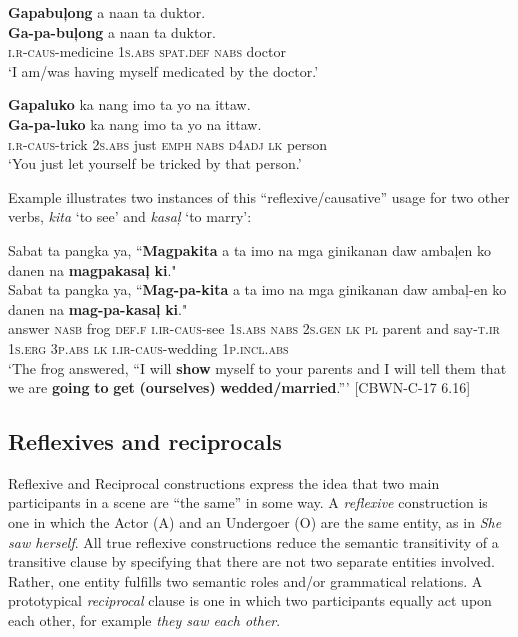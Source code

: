 \ea
\label{bkm:Ref329267373}
\textbf{Gapabuļong}  a  naan  ta  duktor. \\\smallskip
\gll \textbf{Ga-pa-buļong}  a  naan  ta  duktor. \\
\textsc{i.r}-\textsc{caus}-medicine  1\textsc{s.abs}  \textsc{spat.def}  \textsc{nabs}  doctor \\
\glt ‘I am/was having myself medicated by the doctor.’
\z

\ea
\label{bkm:Ref329267376}
\textbf{Gapaluko}  ka  nang  imo  ta  yo  na  ittaw. \\\smallskip
\gll \textbf{Ga-pa-luko}  ka  nang  imo  ta  yo  na  ittaw. \\
\textsc{i.r}-\textsc{caus}-trick  2\textsc{s.abs}  just  \textsc{emph}  \textsc{nabs}  \textsc{d4adj}  \textsc{lk}  person \\
\glt ‘You just let yourself be tricked by that person.'
\z

Example  illustrates two instances of this “reflexive/causative” usage for two other verbs, \textit{kita} ‘to see’ and \textit{kasaļ} ‘to marry’:

\largerpage
\ea
\label{bkm:Ref108689939}
Sabat  ta  pangka  ya,  “\textbf{Magpakita}  a  ta  imo  na  mga ginikanan  daw  ambaļen  ko  danen  na  \textbf{magpakasaļ}  \textbf{ki}." \\\smallskip
\gll Sabat  ta  pangka  ya,  “\textbf{Mag-pa-kita}  a  ta  imo  na  mga ginikanan  daw  ambaļ-en  ko  danen  na  \textbf{mag-pa-kasaļ}  \textbf{ki}." \\
answer  \textsc{nasb}  frog  \textsc{def.f}  \textsc{i.ir}-\textsc{caus}-see  1\textsc{s.abs}  \textsc{nabs}  2\textsc{s.gen}  \textsc{lk}  \textsc{pl}
parent  and  say-\textsc{t.ir}  1\textsc{s.erg}  3\textsc{p.abs}  \textsc{lk}  \textsc{i.ir}-\textsc{caus}-wedding  1\textsc{p.incl.abs} \\
\glt `The frog answered, “I will \textbf{show} myself to your parents and I will tell them that we are \textbf{going} \textbf{to} \textbf{get} \textbf{(ourselves)} \textbf{wedded/married}.”' [CBWN-C-17 6.16]
\z
\subsection{Reflexives and reciprocals}
\label{sec:reflexivesandreciprocals}

Reflexive and Reciprocal constructions 
express the idea that two main participants in a scene are “the same” in some way. A \textit{reflexive} construction is one in which the Actor (A) and an Undergoer (O) are the same entity, as in \textit{She saw herself}. All true reflexive constructions reduce the semantic transitivity of a transitive clause by specifying that there are not two separate entities involved. Rather, one entity fulfills two semantic roles and/or grammatical relations. A prototypical \textit{reciprocal} clause is one in which two participants equally act upon each other, for example \textit{they saw each other}.

